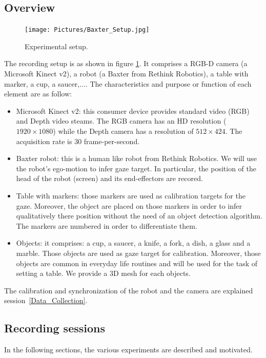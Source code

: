 \documentclass[11pt,a4paper]{article}
\begin{document}
\subsection{Overview}
\label{Overview}
\begin{figure}[!ht]
\begin{center}
\texttt{[image: Pictures/Baxter\_Setup.jpg]}
\end{center}
\caption{Experimental setup. \label{Experimental_Setup}}
\end{figure}
The recording setup is as shown in figure \ref{Experimental_Setup}. It comprises a RGB-D camera (a Microsoft Kinect v2), a robot (a Baxter from Rethink Robotics), a table with marker, a cup, a saucer,.... The characteristics and purpose or function of each element are as follow:
\begin{itemize}
\item Microsoft Kinect v2: this consumer device provides standard video (RGB) and Depth video steams. The RGB camera has an HD resolution ($1920 \times 1080$) while the Depth camera has a resolution of $512 \times 424$. The acquisition rate is 30 frame-per-second.
\item Baxter robot: this is a human like robot from Rethink Robotics. We will use the robot's ego-motion to infer gaze target. In particular, the position of the head of the robot (screen) and its end-effectors are recored.
\item Table with markers: those markers are used as calibration targets for the gaze. Moreover, the object are placed on those markers in order to infer qualitatively there position without the need of an object detection algorithm. The markers are numbered in order to differentiate them.
\item Objects: it comprises: a cup, a saucer, a knife, a fork, a dish, a glass and a marble. Those objects are used as gaze target for calibration. Moreover, those objects are common in everyday life routines and will be used for the task of setting a table. We provide a 3D mesh for each objects.
\end{itemize}

The calibration and synchronization of the robot and the camera are explained session~\ref{Data_Collection}.

\subsection{Recording sessions}
In the following sections, the various experiments are described and motivated.
\end{document}
